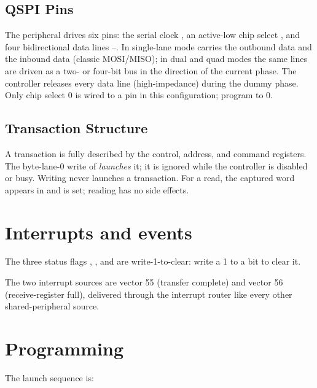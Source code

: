 \subsection{QSPI Pins}

The  peripheral drives six pins: the serial clock , an active-low chip select , and four bidirectional data lines --. In single-lane mode  carries the outbound data and  the inbound data (classic MOSI/MISO); in dual and quad modes the same lines are driven as a two- or four-bit bus in the direction of the current phase. The controller releases every data line (high-impedance) during the dummy phase. Only chip select 0 is wired to a pin in this configuration; program  to 0.

\subsection{Transaction Structure}

A transaction is fully described by the control, address, and command registers. The byte-lane-0 write of  \emph{launches} it; it is ignored while the controller is disabled or busy. Writing  never launches a transaction. For a read, the captured word appears in  and  is set; reading  has no side effects.

\section{Interrupts and events}

The three status flags , , and  are write-1-to-clear: write a 1 to a bit to clear it.

The two interrupt sources are vector 55 (transfer complete) and vector 56 (receive-register full), delivered through the interrupt router like every other shared-peripheral source.

\section{Programming}

The launch sequence is:

